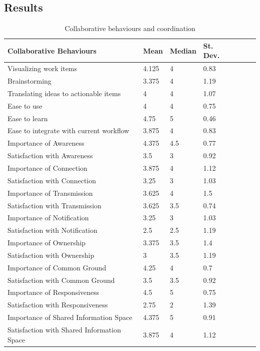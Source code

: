 \documentclass[conference]{IEEEtran}
\begin{document}
\subsection{Results}
\label{sec:results}
\begin{table}[t]
\begin{center}
\begin{tabular}{@{\hspace{.2cm}}llll@{\hspace{.2cm}}c@{\hspace{.2cm}}c@{\hspace{.2cm}}c@{\hspace{.2cm}}}
\hline
Collaborative Behaviours&  Mean&   Median&  St. Dev.&\\
\hline
Visualizing work items& 4.125& 4& 0.83\\
Brainstorming& 3.375& 4& 1.19\\
Translating ideas to actionable items& 4& 4& 1.07\\
Ease to use& 4& 4& 0.75\\
Ease to learn& 4.75& 5& 0.46\\
Ease to integrate with current workflow& 3.875& 4& 0.83\\
\hline
Importance of Awareness& 4.375& 4.5& 0.77\\
Satisfaction with Awareness& 3.5& 3& 0.92\\
\hline
Importance of Connection& 3.875& 4& 1.12\\
Satisfaction with Connection& 3.25& 3& 1.03\\
\hline
Importance of Transmission& 3.625& 4& 1.5\\
Satisfaction with Transmission& 3.625& 3.5& 0.74\\
\hline
Importance of Notification& 3.25& 3& 1.03\\
Satisfaction with Notification& 2.5& 2.5& 1.19\\
\hline
Importance of Ownership& 3.375& 3.5& 1.4\\
Satisfaction with Ownership& 3& 3.5& 1.19\\
\hline
Importance of Common Ground& 4.25& 4& 0.7\\
Satisfaction with Common Ground& 3.5& 3.5& 0.92\\
\hline
Importance of Responsiveness& 4.5& 5& 0.75\\
Satisfaction with Responsiveness& 2.75& 2& 1.39\\
\hline
Importance of Shared Information Space& 4.375& 5& 0.91\\
Satisfaction with Shared Information Space& 3.875& 4& 1.12\\
\hline
\end{tabular}
\end{center}
\caption{Collaborative behaviours and coordination}
\label{tab:surveyresults}
\end{table}
\end{document}
